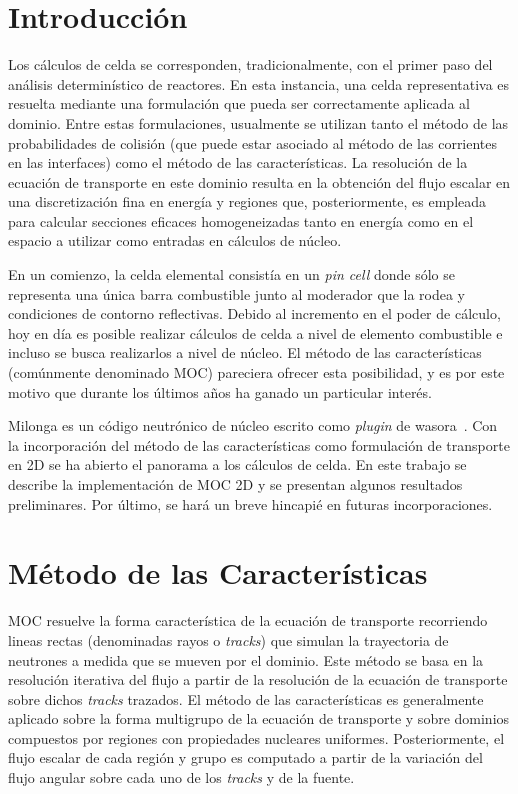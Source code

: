 \documentclass[11pt]{article}
\numberwithin{equation}{section}
\begin{document}
\addtolength{\textheight}{-2cm}

\pagebreak


\tableofcontents
\pagebreak


\section{Introducción}

Los cálculos de celda se corresponden, tradicionalmente, con el primer paso del análisis determinístico de reactores. En esta instancia, una celda representativa es resuelta mediante una formulación que pueda ser correctamente aplicada al dominio. Entre estas formulaciones, usualmente se utilizan tanto el método de las probabilidades de colisión (que puede estar asociado al método de las corrientes en las interfaces) como el método de las características. La resolución de la ecuación de transporte en este dominio resulta en la obtención del flujo escalar en una discretización fina en energía y regiones que, posteriormente, es empleada para calcular secciones eficaces homogeneizadas tanto en energía como en el espacio a utilizar como entradas en cálculos de núcleo.

En un comienzo, la celda elemental consistía en un \emph{pin cell} donde sólo se representa una única barra combustible junto al moderador que la rodea y condiciones de contorno reflectivas. Debido al incremento en el poder de cálculo, hoy en día es posible realizar cálculos de celda a nivel de elemento combustible e incluso se busca realizarlos a nivel de núcleo. El método de las características (comúnmente denominado MOC) pareciera ofrecer esta posibilidad, y es por este motivo que durante los últimos años ha ganado un particular interés. 

Milonga es un código neutrónico de núcleo escrito como \emph{plugin} de wasora~\cite{wasora}. Con la incorporación del método de las características como formulación de transporte en 2D se ha abierto el panorama a los cálculos de celda. En este trabajo se describe la implementación de MOC 2D y se presentan algunos resultados preliminares. Por último, se hará un breve hincapié en futuras incorporaciones.


\section{Método de las Características}

MOC resuelve la forma característica de la ecuación de transporte recorriendo lineas rectas (denominadas rayos o \emph{tracks}) que simulan la trayectoria de neutrones a medida que se mueven por el dominio. Este método se basa en la resolución iterativa del flujo a partir de la resolución de la ecuación de transporte sobre dichos \emph{tracks} trazados. El método de las características es generalmente aplicado sobre la forma multigrupo de la ecuación de transporte y sobre dominios compuestos por regiones con propiedades nucleares uniformes. Posteriormente, el flujo escalar de cada región y grupo es computado a partir de la variación del flujo angular sobre cada uno de los \emph{tracks} y de la fuente. 
\end{document}

